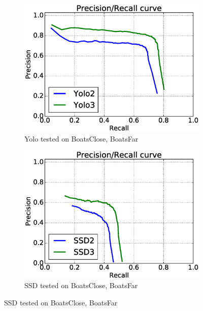 \begin{figure}[h!]
\begin{subfigure}{.5\textwidth}
  \centering
  \includegraphics[width=0.8\linewidth]{results/case_buildings/prec_recall/yolo/bcbf.eps}
  \caption{Yolo tested on BoatsClose, BoatsFar}
  \label{fig:sfig1}
\end{subfigure}%
\begin{subfigure}{.5\textwidth}
  \centering
  \includegraphics[width=.8\linewidth]{results/case_buildings/prec_recall/ssd/bcbf.eps}
  \caption{SSD tested on BoatsClose, BoatsFar}
  \label{fig:sfig2}
\end{subfigure}


\end{figure}

